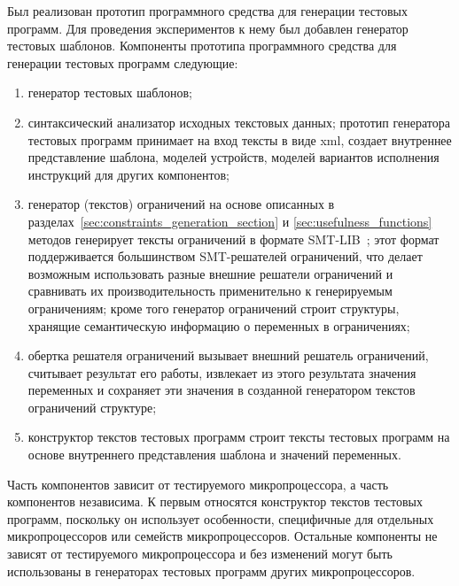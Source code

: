 Был реализован прототип программного средства для генерации тестовых программ. Для проведения экспериментов к нему был добавлен генератор тестовых шаблонов. Компоненты прототипа программного средства для генерации тестовых программ следующие: %
\begin{enumerate}
  \item генератор тестовых шаблонов;
  \item синтаксический анализатор исходных текстовых данных; прототип генератора тестовых программ принимает на вход тексты в виде xml, создает внутреннее представление шаблона, моделей устройств, моделей вариантов исполнения инструкций для других компонентов;
  \item генератор (текстов) ограничений на основе описанных в разделах~\ref{sec:constraints_generation_section} и \ref{sec:usefulness_functions} методов генерирует тексты ограничений в формате SMT-LIB~\cite{SMT}; этот формат поддерживается большинством SMT-решателей ограничений, что делает возможным использовать разные внешние решатели ограничений и сравнивать их производительность применительно к генерируемым ограничениям; кроме того генератор ограничений строит структуры, хранящие семантическую информацию о переменных в ограничениях;
  \item обертка решателя ограничений вызывает внешний решатель ограничений, считывает результат его работы, извлекает из этого результата значения переменных и сохраняет эти значения в созданной генератором текстов ограничений структуре;
  \item конструктор текстов тестовых программ строит тексты тестовых программ на основе внутреннего представления шаблона и значений переменных.
\end{enumerate}

Часть компонентов зависит от тестируемого микропроцессора, а часть компонентов независима. К первым относятся конструктор текстов тестовых программ, поскольку он использует особенности, специфичные для отдельных микропроцессоров или семейств микропроцессоров. Остальные компоненты не зависят от тестируемого микропроцессора и без изменений могут быть использованы в генераторах тестовых программ других микропроцессоров.

